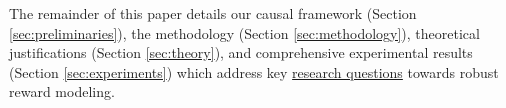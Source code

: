 The remainder of this paper details our causal framework (Section \ref{sec:preliminaries}), the \carma{} methodology (Section \ref{sec:methodology}), theoretical justifications (Section \ref{sec:theory}), and comprehensive experimental results (Section \ref{sec:experiments}) which address key \hyperref[list:research_questions]{research questions} towards robust reward modeling.
